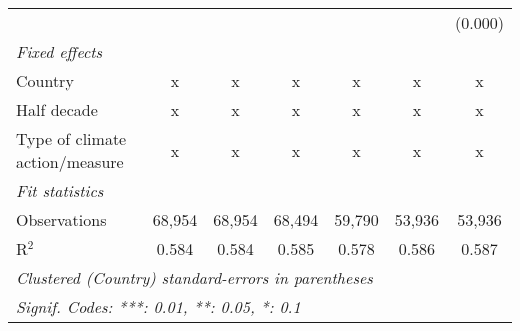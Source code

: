 \begin{tabular}{lcccccc}
                                                &              &                &                &                &                & (0.000)\\   
   \emph{Fixed effects}\\
   Country                                      & x            & x              & x              & x              & x              & x\\  
   Half decade                                  & x            & x              & x              & x              & x              & x\\  
   Type of climate action/measure               & x            & x              & x              & x              & x              & x\\  
   \midrule \emph{Fit statistics}\\
   Observations                                 & 68,954       & 68,954         & 68,494         & 59,790         & 53,936         & 53,936\\  
   R$^2$                                        & 0.584        & 0.584          & 0.585          & 0.578          & 0.586          & 0.587\\  
   \midrule
   \multicolumn{7}{l}{\emph{Clustered (Country) standard-errors in parentheses}}\\
   \multicolumn{7}{l}{\emph{Signif. Codes: ***: 0.01, **: 0.05, *: 0.1}}\\
\end{tabular}
\par\endgroup


